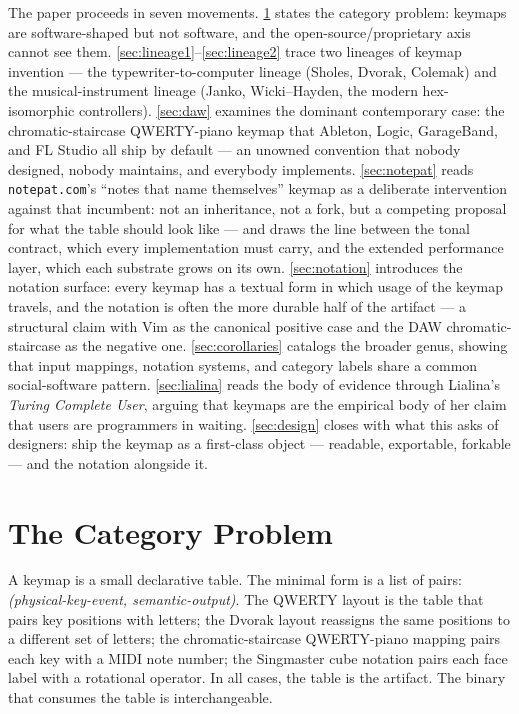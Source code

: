 \documentclass[10pt,letterpaper,twocolumn]{article}
\begin{document}
The paper proceeds in seven movements. \textsection\ref{sec:category} states the category problem: keymaps are software-shaped but not software, and the open-source/proprietary axis cannot see them. \textsection\ref{sec:lineage1}--\ref{sec:lineage2} trace two lineages of keymap invention --- the typewriter-to-computer lineage (Sholes, Dvorak, Colemak) and the musical-instrument lineage (Janko, Wicki--Hayden, the modern hex-isomorphic controllers). \textsection\ref{sec:daw} examines the dominant contemporary case: the chromatic-staircase QWERTY-piano keymap that Ableton, Logic, GarageBand, and FL Studio all ship by default --- an unowned convention that nobody designed, nobody maintains, and everybody implements. \textsection\ref{sec:notepat} reads \texttt{notepat.com}'s ``notes that name themselves'' keymap as a deliberate intervention against that incumbent: not an inheritance, not a fork, but a competing proposal for what the table should look like --- and draws the line between the tonal contract, which every implementation must carry, and the extended performance layer, which each substrate grows on its own. \textsection\ref{sec:notation} introduces the notation surface: every keymap has a textual form in which usage of the keymap travels, and the notation is often the more durable half of the artifact --- a structural claim with Vim as the canonical positive case and the DAW chromatic-staircase as the negative one. \textsection\ref{sec:corollaries} catalogs the broader genus, showing that input mappings, notation systems, and category labels share a common social-software pattern. \textsection\ref{sec:lialina} reads the body of evidence through Lialina's \emph{Turing Complete User}, arguing that keymaps are the empirical body of her claim that users are programmers in waiting. \textsection\ref{sec:design} closes with what this asks of designers: ship the keymap as a first-class object --- readable, exportable, forkable --- and the notation alongside it.

\section{The Category Problem}
\label{sec:category}

A keymap is a small declarative table. The minimal form is a list of pairs: \emph{(physical-key-event, semantic-output)}. The QWERTY layout is the table that pairs key positions with letters; the Dvorak layout reassigns the same positions to a different set of letters; the chromatic-staircase QWERTY-piano mapping pairs each key with a MIDI note number; the Singmaster cube notation pairs each face label with a rotational operator. In all cases, the table is the artifact. The binary that consumes the table is interchangeable.
\end{document}
